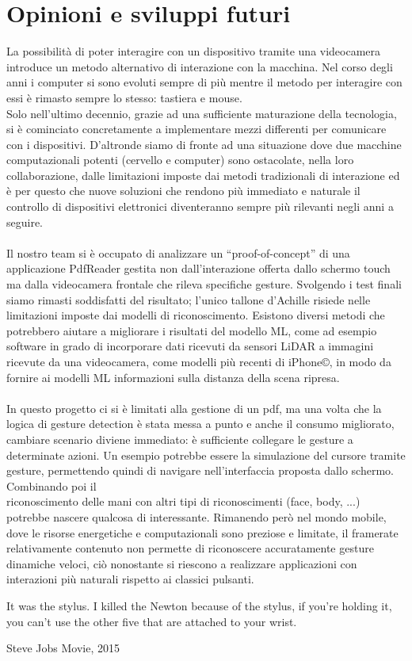 \section{Opinioni e sviluppi futuri}
La possibilità di poter interagire con un dispositivo tramite una videocamera introduce un metodo alternativo di interazione con la macchina. Nel corso degli anni i computer si sono evoluti sempre di più mentre il metodo per interagire con essi è rimasto sempre lo stesso: tastiera e mouse.\\
Solo nell'ultimo decennio, grazie ad una sufficiente maturazione della tecnologia, si è cominciato concretamente a implementare mezzi differenti per comunicare con i dispositivi. D'altronde siamo di fronte ad una situazione dove due macchine computazionali potenti (cervello e computer) sono ostacolate, nella loro collaborazione, dalle limitazioni imposte dai metodi tradizionali di interazione ed è per questo che nuove soluzioni che rendono più immediato e naturale il controllo di dispositivi elettronici diventeranno sempre più rilevanti negli anni a seguire.\\
\\
\noindent Il nostro team si è occupato di analizzare un “proof-of-concept” di una applicazione PdfReader gestita non dall'interazione offerta dallo schermo touch ma dalla videocamera frontale che rileva specifiche gesture. Svolgendo i test finali siamo rimasti soddisfatti del risultato; l'unico tallone d'Achille risiede nelle limitazioni imposte dai modelli di riconoscimento.
Esistono diversi metodi che potrebbero aiutare a migliorare i risultati del modello ML, come ad esempio software in grado di incorporare dati ricevuti da sensori LiDAR a immagini ricevute da una videocamera, come modelli più recenti di iPhone©, in modo da fornire ai modelli ML informazioni sulla distanza della scena ripresa.\\
\\
\noindent In questo progetto ci si è limitati alla gestione di un pdf, ma una volta che la logica di gesture detection è stata messa a punto e anche il consumo migliorato, cambiare scenario diviene immediato: è sufficiente collegare le gesture a determinate azioni. Un esempio potrebbe essere la simulazione del cursore tramite gesture, permettendo quindi di navigare nell'interfaccia proposta dallo schermo. Combinando poi il \\
riconoscimento delle mani con altri tipi di riconoscimenti (face, body, ...) potrebbe nascere qualcosa di interessante. Rimanendo però nel mondo mobile, dove le risorse energetiche e computazionali sono preziose e limitate, il framerate relativamente contenuto non permette di riconoscere accuratamente gesture dinamiche veloci, ciò nonostante si riescono a realizzare applicazioni con interazioni più naturali rispetto ai classici pulsanti.


\epigraph{It was the stylus. I killed the Newton because of the stylus, if you're holding it, you can't use the other five that are attached to your wrist.}{Steve Jobs Movie, 2015}
